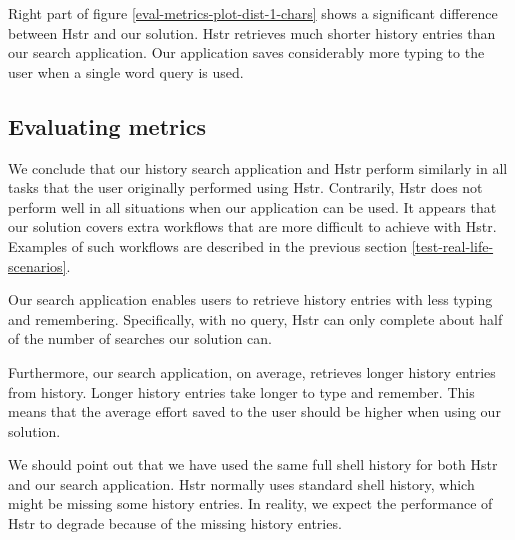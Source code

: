 Right part of figure \ref{eval-metrics-plot-dist-1-chars} shows a significant difference between Hstr and our solution. Hstr retrieves much shorter history entries than our search application. Our application saves considerably more typing to the user when a single word query is used. 

\subsection{Evaluating metrics}

We conclude that our history search application and Hstr perform similarly in all tasks that the user originally performed using Hstr. Contrarily, Hstr does not perform well in all situations when our application can be used. It appears that our solution covers extra workflows that are more difficult to achieve with Hstr. Examples of such workflows are described in the previous section \ref{test-real-life-scenarios}. 

Our search application enables users to retrieve history entries with less typing and remembering. Specifically, with no query, Hstr can only complete about half of the number of searches our solution can. 

Furthermore, our search application, on average, retrieves longer history entries from history. Longer history entries take longer to type and remember. This means that the average effort saved to the user should be higher when using our solution. 

We should point out that we have used the same full shell history for both Hstr and our search application. Hstr normally uses standard shell history, which might be missing some history entries. In reality, we expect the performance of Hstr to degrade because of the missing history entries.

